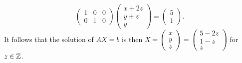 \begin{example}
\[\begin{pmatrix}
		1 & 0 & 0\\
		0 & 1 & 0
	\end{pmatrix}\begin{pmatrix}
		x+2z\\
		y+z\\
		y
	\end{pmatrix}
	=\begin{pmatrix}
		5\\
		1
	\end{pmatrix}.
	\]
	It follows that the solution of $AX=b$ is then $X=\begin{pmatrix}
		x\\
		y\\
		z
	\end{pmatrix}
	=\begin{pmatrix}
		5-2z\\
		1-z\\
		z
	\end{pmatrix}$ for $z\in\mathbb{Z}$. 
\end{example}

